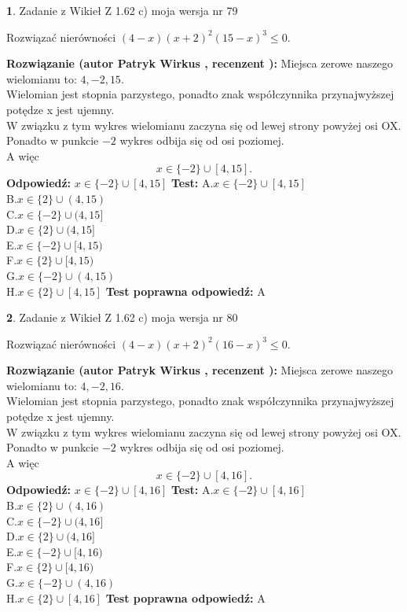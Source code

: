 \documentclass[12pt, a4paper]{article}
\theoremstyle{definition} %
\newtheorem{zad}{}
\newcommand{\zadStart}[1]{\begin{zad}#1\newline}
\newcommand{\zadStop}{\end{zad}}
\newcommand{\rozwStart}[2]{\noindent \textbf{Rozwiązanie (autor #1 , recenzent #2): }\newline}
\newcommand{\rozwStop}{\newline}
\newcommand{\odpStart}{\noindent \textbf{Odpowiedź:}\newline}
\newcommand{\odpStop}{\newline}
\newcommand{\testStart}{\noindent \textbf{Test:}\newline}
\newcommand{\testStop}{\newline}
\newcommand{\kluczStart}{\noindent \textbf{Test poprawna odpowiedź:}\newline}
\newcommand{\kluczStop}{\newline}
\begin{document}
\zadStart{Zadanie z Wikieł Z 1.62 c) moja wersja nr 79}

Rozwiązać nierówności $(4-x)(x+2)^{2}(15-x)^{3}\le0$.
\zadStop
\rozwStart{Patryk Wirkus}{}
Miejsca zerowe naszego wielomianu to: $4, -2, 15$.\\
Wielomian jest stopnia parzystego, ponadto znak współczynnika przy\linebreak najwyższej potędze x jest ujemny.\\ W związku z tym wykres wielomianu zaczyna się od lewej strony powyżej osi OX.\\
Ponadto w punkcie $-2$ wykres odbija się od osi poziomej.\\
A więc $$x \in \{-2\} \cup [4,15].$$
\rozwStop
\odpStart
$x \in \{-2\} \cup [4,15]$
\odpStop
\testStart
A.$x \in \{-2\} \cup [4,15]$\\
B.$x \in \{2\} \cup (4,15)$\\
C.$x \in \{-2\} \cup (4,15]$\\
D.$x \in \{2\} \cup (4,15]$\\
E.$x \in \{-2\} \cup [4,15)$\\
F.$x \in \{2\} \cup [4,15)$\\
G.$x \in \{-2\} \cup (4,15)$\\
H.$x \in \{2\} \cup [4,15]$
\testStop
\kluczStart
A
\kluczStop



\zadStart{Zadanie z Wikieł Z 1.62 c) moja wersja nr 80}

Rozwiązać nierówności $(4-x)(x+2)^{2}(16-x)^{3}\le0$.
\zadStop
\rozwStart{Patryk Wirkus}{}
Miejsca zerowe naszego wielomianu to: $4, -2, 16$.\\
Wielomian jest stopnia parzystego, ponadto znak współczynnika przy\linebreak najwyższej potędze x jest ujemny.\\ W związku z tym wykres wielomianu zaczyna się od lewej strony powyżej osi OX.\\
Ponadto w punkcie $-2$ wykres odbija się od osi poziomej.\\
A więc $$x \in \{-2\} \cup [4,16].$$
\rozwStop
\odpStart
$x \in \{-2\} \cup [4,16]$
\odpStop
\testStart
A.$x \in \{-2\} \cup [4,16]$\\
B.$x \in \{2\} \cup (4,16)$\\
C.$x \in \{-2\} \cup (4,16]$\\
D.$x \in \{2\} \cup (4,16]$\\
E.$x \in \{-2\} \cup [4,16)$\\
F.$x \in \{2\} \cup [4,16)$\\
G.$x \in \{-2\} \cup (4,16)$\\
H.$x \in \{2\} \cup [4,16]$
\testStop
\kluczStart
A
\kluczStop
\end{document}
